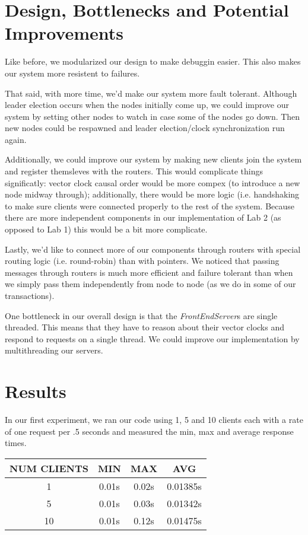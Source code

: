 \documentclass[11pt]{article}
\begin{document}
\section{Design, Bottlenecks and Potential Improvements}
Like before, we modularized our design to make debuggin easier.  This
also makes our system more resistent to failures.

That said, with more time, we'd make our system more fault
tolerant.  Although leader election occurs when the nodes initially
come up, we could improve our system by setting other nodes to watch
in case some of the nodes go down.  Then new nodes could be respawned
and leader election/clock synchronization run again.

Additionally, we could improve our system by making new clients join
the system and register themsleves with the routers.  This would
complicate things significatly: vector clock causal order would be
more compex (to introduce a new node midway through); additionally,
there would be more logic (i.e. handshaking to make sure clients were
connected properly to the rest of the system.  Because there are more
independent components in our implementation of Lab 2 (as opposed to
Lab 1) this would be a bit more complicate.

Lastly, we'd like to connect more of our components through routers
with special routing logic (i.e. round-robin) than with pointers. We
noticed that passing messages through routers is much more efficient
and failure tolerant than when we simply pass them independently from
node to node (as we do in some of our transactions).

One bottleneck in our overall design is that the
\emph{FrontEndServer}s are single threaded.  This means that they have
to reason about their vector clocks and respond to requests on a single
thread.  We could improve our implementation by multithreading our servers.

\section{Results}
In our first experiment, we ran our code using 1, 5 and 10 clients
each with a rate of one request per .5 seconds and measured the min,
max and average response times.

\begin{tabular}{c|c|c|c}
  NUM CLIENTS & MIN & MAX & AVG \\
  \hline
  1  & 0.01s & 0.02s & 0.01385s \\
  5  & 0.01s & 0.03s & 0.01342s \\
  10 & 0.01s & 0.12s & 0.01475s \\
\end{tabular}
\end{document}
